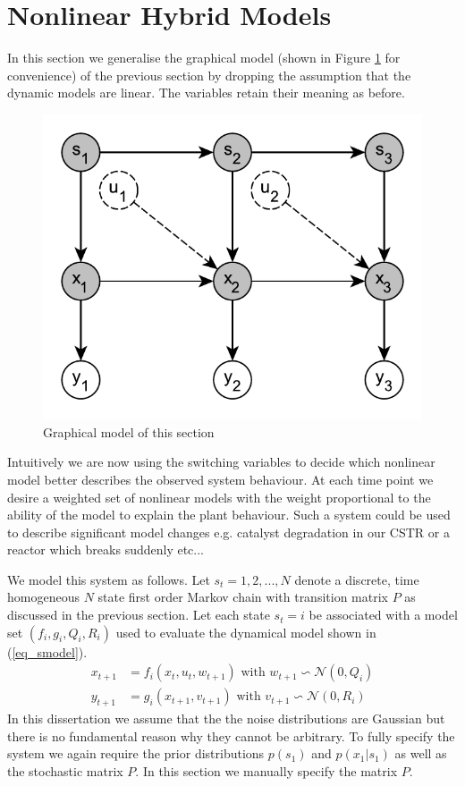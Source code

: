 \documentclass[../masters.tex]{subfiles}
\begin{document}
\graphicspath{{./imgs/}{../imgs/}} %

\section{Nonlinear Hybrid Models}
In this section we generalise the graphical model (shown in Figure \ref{fig_hybridmod2} for convenience) of the previous section by dropping the assumption that the dynamic models are linear. The variables retain their meaning as before.     
\begin{figure}[H] 
\centering
\includegraphics[scale=1.0]{hybrid_model.pdf}
\caption{Graphical model of this section}
\label{fig_hybridmod2}
\end{figure}
Intuitively we are now using the switching variables to decide which nonlinear model better describes the observed system behaviour. At each time point we desire a weighted set of nonlinear models with the weight proportional to the ability of the model to explain the plant behaviour. Such a system could be used to describe significant model changes e.g. catalyst degradation in our CSTR or a reactor which breaks suddenly etc... 

We model this system as follows. Let $s_t=1,2,..., N$ denote a discrete, time homogeneous $N$ state first order Markov chain with transition matrix $P$ as discussed in the previous section. Let each state $s_t=i$ be associated with a model set $\left(f_i, g_i, Q_i, R_i \right)$ used to evaluate the dynamical model shown in (\ref{eq_smodel}).
\begin{equation}
\begin{aligned}
x_{t+1} &= f_i(x_t, u_t, w_{t+1}) \text{ with } w_{t+1} \backsim \mathcal{N}(0, Q_i)\\
y_{t+1} &= g_i(x_{t+1}, v_{t+1}) \text{ with } v_{t+1} \backsim \mathcal{N}(0,R_i)
\end{aligned}
\label{eq_smodel}
\end{equation}
In this dissertation we assume that the the noise distributions are Gaussian but there is no fundamental reason why they cannot be arbitrary. To fully specify the system we again require the prior distributions $p(s_1)$ and $p(x_1|s_1)$ as well as the stochastic matrix $P$. In this section we manually specify the matrix $P$. 
\end{document}
